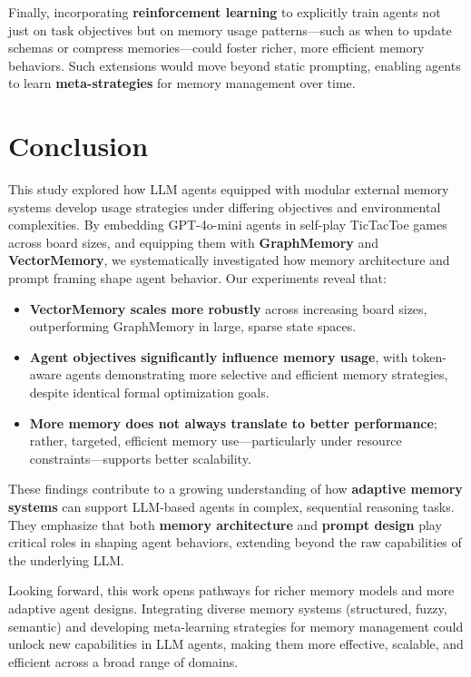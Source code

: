 \documentclass[10pt]{article}
\begin{document}
Finally, incorporating \textbf{reinforcement learning} to explicitly train agents not just on task objectives but on memory usage patterns—such as when to update schemas or compress memories—could foster richer, more efficient memory behaviors. Such extensions would move beyond static prompting, enabling agents to learn \textbf{meta-strategies} for memory management over time.

\section{Conclusion}

This study explored how LLM agents equipped with modular external memory systems develop usage strategies under differing objectives and environmental complexities. By embedding GPT-4o-mini agents in self-play TicTacToe games across board sizes, and equipping them with \textbf{GraphMemory} and \textbf{VectorMemory}, we systematically investigated how memory architecture and prompt framing shape agent behavior. Our experiments reveal that:

\begin{itemize}[leftmargin=*,nosep]
    \item \textbf{VectorMemory scales more robustly} across increasing board sizes, outperforming GraphMemory in large, sparse state spaces.
    \item \textbf{Agent objectives significantly influence memory usage}, with token-aware agents demonstrating more selective and efficient memory strategies, despite identical formal optimization goals.
    \item \textbf{More memory does not always translate to better performance}; rather, targeted, efficient memory use—particularly under resource constraints—supports better scalability.
\end{itemize}

These findings contribute to a growing understanding of how \textbf{adaptive memory systems} can support LLM-based agents in complex, sequential reasoning tasks. They emphasize that both \textbf{memory architecture} and \textbf{prompt design} play critical roles in shaping agent behaviors, extending beyond the raw capabilities of the underlying LLM.

Looking forward, this work opens pathways for richer memory models and more adaptive agent designs. Integrating diverse memory systems (structured, fuzzy, semantic) and developing meta-learning strategies for memory management could unlock new capabilities in LLM agents, making them more effective, scalable, and efficient across a broad range of domains.



\end{document}
